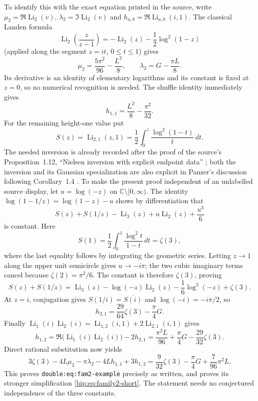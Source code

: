 \documentclass[11pt,a4paper]{article}
\numberwithin{equation}{section}
\theoremstyle{definition}
\theoremstyle{remark}
\DeclareMathOperator{\Li}{Li}
\begin{document}
To identify this with the exact equation printed in the source, write
$\mu_2=\Re\Li_2(v)$, $\lambda_2=\Im\Li_2(v)$ and
$h_{a,b}=\Re\Li_{a,b}(i,1)$. The classical Landen formula
\[
 \Li_2\!\left(\frac z{z-1}\right)
      =-\Li_2(z)-\frac12\log^2(1-z)
\]
(applied along the segment $z=it$, $0\le t\le1$) gives
\[
 \mu_2=\frac{5\pi^2}{96}-\frac{L^2}{8},\qquad
 \lambda_2=G-\frac{\pi L}{8}.
\]
Its derivative is an identity of elementary logarithms and its
constant is fixed at $z=0$, so no numerical recognition is needed.
The shuffle identity immediately gives
\[
 h_{1,1}=\frac{L^2}{8}-\frac{\pi^2}{32}.
\]
For the remaining height-one value put
\[
 S(z)=\Li_{2,1}(z,1)=\frac12\int_0^z\frac{\log^2(1-t)}t\,dt.
\]
The needed inversion is already recorded after the proof of the source's
Proposition~1.12, ``Nielsen inversion with explicit endpoint data''
\cite{SourceManuscript}; both the inversion and its Gaussian specialization
are also explicit in Panzer's discussion following Corollary~1.4
\cite{bip:Panzer2017}.  To make the present proof independent of an
unlabelled source display, let $u=\log(-z)$ on
$\mathbb C\setminus[0,\infty)$.  The identity
$\log(1-1/z)=\log(1-z)-u$ shows by differentiation that
\[
 S(z)+S(1/z)-\Li_3(z)+u\Li_2(z)+\frac{u^3}{6}
\]
is constant.  Here
\[
 S(1)=\frac12\int_0^1\frac{\log^2t}{1-t}\,dt=\zeta(3),
\]
where the last equality follows by integrating the geometric series.
Letting $z\to1$ along the upper unit semicircle gives $u\to-i\pi$;
the two cubic imaginary terms cancel because $\zeta(2)=\pi^2/6$.
The constant is therefore $\zeta(3)$, proving
\begin{equation}\label{bip:eq:nielsen-inversion}
 S(z)+S(1/z)=\Li_3(z)-\log(-z)\Li_2(z)
               -\frac16\log^3(-z)+\zeta(3).
\end{equation}
At $z=i$, conjugation gives $S(1/i)=\overline{S(i)}$ and
$\log(-i)=-i\pi/2$, so
\[
 h_{2,1}=\frac{29}{64}\zeta(3)-\frac\pi4G.
\]
Finally $\Li_1(i)\Li_2(i)=\Li_{1,2}(i,1)+2\Li_{2,1}(i,1)$
gives
\[
 h_{1,2}=\Re\bigl(\Li_1(i)\Li_2(i)\bigr)-2h_{2,1}
       =\frac{\pi^2L}{96}+\frac\pi4G-\frac{29}{32}\zeta(3).
\]
Direct rational substitution now yields
\[
 3\zeta(3)-4L\mu_2-\pi\lambda_2-4Lh_{1,1}+3h_{1,2}
 =\frac9{32}\zeta(3)-\frac\pi4G+\frac7{96}\pi^2L.
\]
This proves \texttt{double:eq:fam2-example} precisely as written,
and proves its stronger simplification \eqref{bip:eq:family2-short}.
The statement needs no conjectured independence of the three constants.
\end{document}
